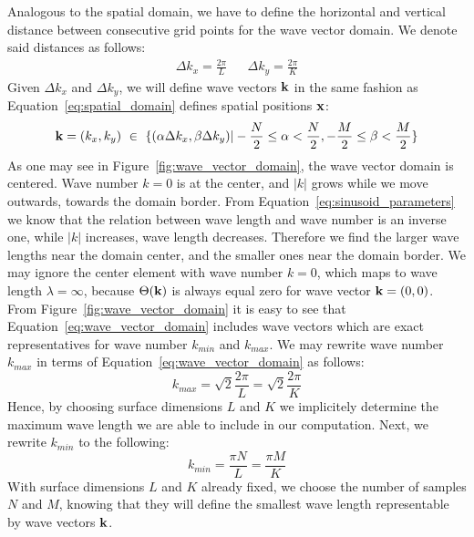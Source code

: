 %
Analogous to the spatial domain, we have to define the horizontal and vertical 
distance between consecutive grid points for the wave vector domain. We denote 
said distances as follows:
\begin{align}
\label{eq:delta_kx_delta_ky}
 \Delta k_x = \frac{2\pi}{L} && \Delta k_y = \frac{2\pi}{K}
\end{align}
%
Given $\Delta k_x$ and $\Delta k_y$, we will define wave vectors $\mathbf{k}$ in 
the same fashion as Equation~\ref{eq:spatial_domain} defines spatial positions 
$\mathbf{x}$:
\begin{equation}
\label{eq:wave_vector_domain}
 \mathbf{k} = (k_x,k_y)~\in~\{(\alpha\Delta k_x,\beta\Delta k_y)|
-\frac{N}{2}\leq\alpha<\frac{N}{2},-\frac{M}{2}\leq\beta<\frac{M}{2}\}
\end{equation}
%
As one may see in Figure~\ref{fig:wave_vector_domain}, the wave vector domain 
is centered. Wave number $k = 0$ is at the center, and $|k|$ grows while we 
move outwards, towards the domain border. From
Equation~\ref{eq:sinusoid_parameters} we know that the relation between wave 
length and wave number is an inverse one, while $|k|$ increases, wave length 
decreases. Therefore we find the larger wave lengths near the domain center, 
and the smaller ones near the domain border. We may ignore the center element 
with wave number $k = 0$, which maps to wave length $\lambda = \infty$, because 
$\Theta(\mathbf{k})$ is always equal zero for wave vector $\mathbf{k} = (0, 0)$.\\

From Figure~\ref{fig:wave_vector_domain} it is easy to see that  
Equation~\ref{eq:wave_vector_domain} includes wave vectors which are exact 
representatives for wave number $k_{min}$ and $k_{max}$. We may rewrite wave 
number $k_{max}$ in terms of Equation~\ref{eq:wave_vector_domain} as follows:
\begin{equation}
 k_{max} = \sqrt{2}\frac{2\pi}{L} = \sqrt{2}\frac{2\pi}{K}
\end{equation}
Hence, by choosing surface dimensions $L$ and $K$ we implicitely determine the 
maximum wave length we are able to include in our computation. Next, we rewrite 
$k_{min}$ to the following:
\begin{equation}
 k_{min} = \frac{\pi N}{L} = \frac{\pi M}{K}
\end{equation}
With surface dimensions $L$ and $K$ already fixed, we choose the number of 
samples $N$ and $M$, knowing that they will define the smallest wave length 
representable by wave vectors $\mathbf{k}$.
%
